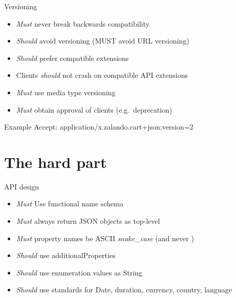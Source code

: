 \documentclass[10pt]{beamer}
\begin{document}
\begin{frame}{Versioning}
  \begin{itemize}
    \item \emph{Must} never break backwards compatibility
    \item \emph{Should} avoid versioning (MUST avoid URL versioning)
    \item \emph{Should} prefer compatible extensions
    \item Clients \emph{should} not crash on compatible API extensions
    \item \emph{Must} use media type versioning
    \item \emph{Must} obtain approval of clients (e.g.~deprecation)
  \end{itemize}

  \begin{block}{Example}
    Accept: application/x.zalando.cart+json;version=2
  \end{block}
\end{frame}

\section{The hard part}

\begin{frame}{API design}
  \begin{itemize}
    \item \emph{Must} Use functional name schema
    \item \emph{Must} always return JSON objects as top-level
    \item \emph{Must} property names be ASCII \emph{snake\_case} (and never )
    \item \emph{Should} use additionalProperties
    \item \emph{Should} use enumeration values as String
    \item \emph{Should} use standards for Date, duration, currency, country, language
  \end{itemize}
\end{frame}
\end{document}
